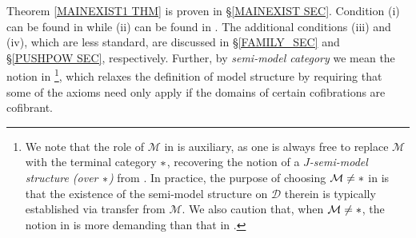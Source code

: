 \documentclass[a4paper,10pt
,draft
]{article}%
\numberwithin{equation}{section}
\numberwithin{figure}{section}
\theoremstyle{definition} %
\newcommand{\Sym}{\ensuremath{\mathsf{Sym}}}%
\newcommand{\V}{\ensuremath{\mathcal V}}
\newcommand{\1}{\ensuremath{\mathbbm 1}}%
\begin{document}
Theorem \ref{MAINEXIST1 THM}
is proven in \S \ref{MAINEXIST SEC}.
Condition (i) can be found in 
\cite[Def. 2.1.17]{Ho98} while (ii) 
can be found in \cite[Def. 4.2.6]{Ho98}.
The additional conditions (iii) and (iv),
which are less standard, are discussed in 
\S \ref{FAMILY_SEC} and
\S \ref{PUSHPOW SEC}, respectively.
%
Further, by \textit{semi-model category}
we mean the notion in 
\cite[Def. 2.2.1]{WY18}\footnote{
  We note that the role of $\mathcal M$ in \cite[Def. 2.2.1]{WY18}
  is auxiliary,
  as one is always free to replace $\mathcal M$ 
  with the terminal category $\**$, 
  recovering the notion of a \textit{$J$-semi-model structure (over $\**$)} from \cite[Def. 1]{Spi01}.
  In practice,
  the purpose of choosing $\mathcal{M} \neq \**$
  in \cite{WY18}
  is that the existence of the
  semi-model structure on $\mathcal D$ therein
  is typically established via transfer from $\mathcal{M}$.
  We also caution that, when $\mathcal{M} \neq \**$,
  the notion in \cite{Spi01}
  is more demanding than that in \cite{WY18}.
},
which relaxes the definition of model structure by requiring that some of the axioms need only apply
if the domains of certain cofibrations are cofibrant. 



\end{document}
